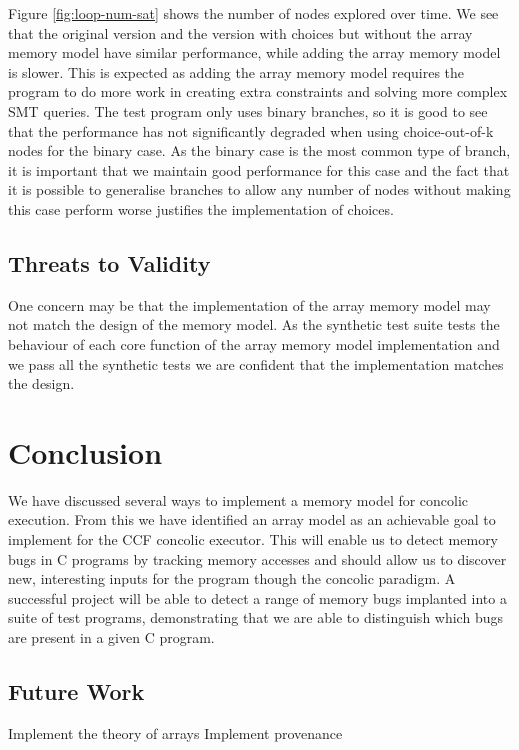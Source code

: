 \documentclass[12pt,twoside]{report}
\begin{document}
Figure \ref{fig:loop-num-sat} shows the number of nodes explored over time. We see that the original version and the version with choices but without the array memory model have similar performance, while adding the array memory model is slower. This is expected as adding the array memory model requires the program to do more work in creating extra constraints and solving more complex SMT queries. The test program only uses binary branches, so it is good to see that the performance has not significantly degraded when using choice-out-of-k nodes for the binary case. As the binary case is the most common type of branch, it is important that we maintain good performance for this case and the fact that it is possible to generalise branches to allow any number of nodes without making this case perform worse justifies the implementation of choices.


\section{Threats to Validity}
One concern may be that the implementation of the array memory model may not match the design of the memory model. As the synthetic test suite tests the behaviour of each core function of the array memory model implementation and we pass all the synthetic tests we are confident that the implementation matches the design.



\chapter{Conclusion}
We have discussed several ways to implement a memory model for concolic execution. From this we have identified an array model as an achievable goal to implement for the CCF concolic executor. This will enable us to detect memory bugs in C programs by tracking memory accesses and should allow us to discover new, interesting inputs for the program though the concolic paradigm. A successful project will be able to detect a range of memory bugs implanted into a suite of test programs, demonstrating that we are able to distinguish which bugs are present in a given C program.

\section{Future Work}
Implement the theory of arrays
Implement provenance



\end{document}
